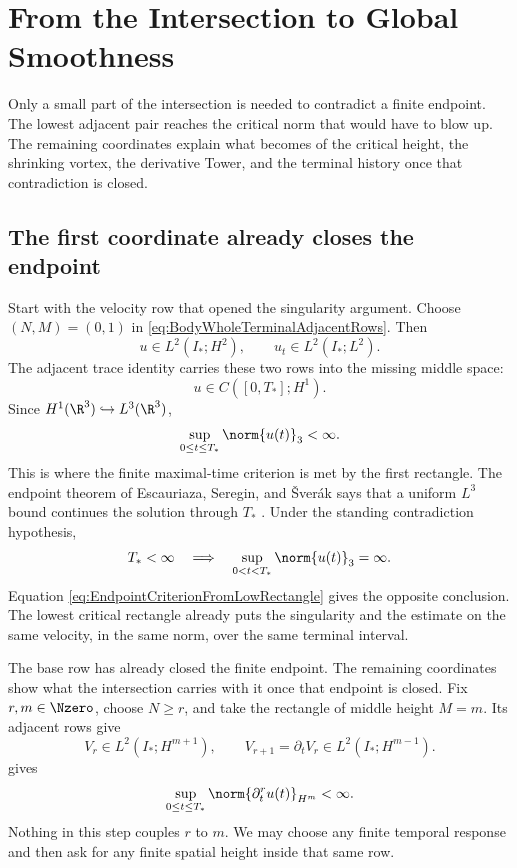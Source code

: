 \clearpage
\section{From the Intersection to Global Smoothness}\label{sec:TheMissingEstimateAndGlobalSmoothness}

Only a small part of the intersection is needed to contradict a finite endpoint.
The lowest adjacent pair reaches the critical norm that would have to blow up.
The remaining coordinates explain what becomes of the critical height, the shrinking vortex, the derivative Tower, and the terminal history once that contradiction is closed.

\subsection{The first coordinate already closes the endpoint}\label{sub:FromFiniteRectanglesToClassicalEstimates}

Start with the velocity row that opened the singularity argument.  Choose
\((N,M)=(0,1)\) in \eqref{eq:BodyWholeTerminalAdjacentRows}.  Then
\[
  u\in L^2(I_*;H^2),
  \qquad
  u_t\in L^2(I_*;L^2).
\]
The adjacent trace identity carries these two rows into the missing middle space:
\[
  u\in C([0,T_*];H^1).
\]
Since \(H^1(\R^3)\hookrightarrow L^3(\R^3)\),
\begin{equation}\label{eq:EndpointCriterionFromLowRectangle}
  \sup_{0\leq t\leq T_*}\norm{u(t)}_3<\infty.
\end{equation}
This is where the finite maximal-time criterion is met by the first rectangle.
The endpoint theorem of Escauriaza, Seregin, and \v{S}ver\'ak says that a uniform
\(L^3\) bound continues the solution through \(T_*\)
\parencite{EscauriazaSereginSverak2003}.  Under the standing contradiction hypothesis,
\begin{equation}\label{eq:FiniteTimeLThreeEscape}
  T_*<\infty
  \quad\Longrightarrow\quad
  \sup_{0<t<T_*}\norm{u(t)}_3=\infty.
\end{equation}
Equation \eqref{eq:EndpointCriterionFromLowRectangle} gives the opposite conclusion.
The lowest critical rectangle already puts the singularity and the estimate on the
same velocity, in the same norm, over the same terminal interval.

The base row has already closed the finite endpoint.  The remaining coordinates show
what the intersection carries with it once that endpoint is closed.  Fix
\(r,m\in\Nzero\), choose \(N\geq r\), and take the rectangle of middle height
\(M=m\).  Its adjacent rows give
\[
  V_r\in L^2(I_*;H^{m+1}),
  \qquad
  V_{r+1}=\partial_tV_r\in L^2(I_*;H^{m-1}).
\]
 gives
\begin{equation}\label{eq:BodyUniformMixedSobolevCoordinate}
  \sup_{0\leq t\leq T_*}
  \norm{\partial_t^ru(t)}_{H^m}
  <\infty.
\end{equation}
Nothing in this step couples \(r\) to \(m\).  We may choose any finite temporal
response and then ask for any finite spatial height inside that same row.

